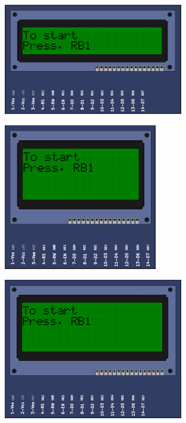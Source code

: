 \begin{figure}[H]
\center
\includegraphics[width=0.7\textwidth]{img/part_hd44780_2x20.png} 
\end{figure} 

\begin{figure}[H]
\center
\includegraphics[width=0.6\textwidth]{img/part_hd44780_4x16.png} 
\end{figure} 

\begin{figure}[H]
\center
\includegraphics[width=0.7\textwidth]{img/part_hd44780_4x20.png} 
\end{figure} 

